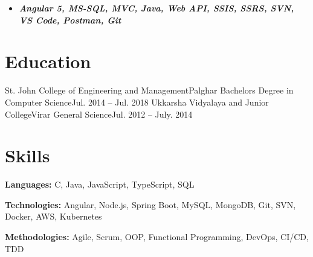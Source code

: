 \documentclass{resume}
\begin{document}
    
            \begin{itemize}[leftmargin=-0.15in, label={}]
                \item\textit{\textbf{\fontsize{10}{12}\selectfont 
                    Angular 5, MS-SQL, MVC, Java, Web API, SSIS, SSRS, SVN, VS Code, Postman, Git
                }}
            \end{itemize}
    \resumeItemListEnd
    
    \resumeSubHeadingListEnd

\section{Education}
  \resumeSubHeadingListStart
    \resumeSubheading
      {St. John College of Engineering and Management}{Palghar}
      {Bachelors Degree in Computer Science}{Jul. 2014 -- Jul. 2018}
    \resumeSubheading
      {Ukkarsha Vidyalaya and Junior College}{Virar}
      {General Science}{Jul. 2012 -- July. 2014}
  \resumeSubHeadingListEnd




\section{Skills}
  \resumeSubHeadingListStart
    \small{\item{
        
        \textbf{Languages:}{ C, Java, JavaScript, TypeScript, SQL} \\ \vspace{3pt}
        
        \textbf{Technologies:}{ Angular, Node.js, Spring Boot, MySQL, MongoDB, Git, SVN, Docker, AWS, Kubernetes} \\ \vspace{3pt}
        
        \textbf{Methodologies:}{ Agile, Scrum, OOP, Functional Programming, DevOps, CI/CD, TDD} \\ \vspace{3pt}
        
    }}
  \resumeSubHeadingListEnd


\end{document}
